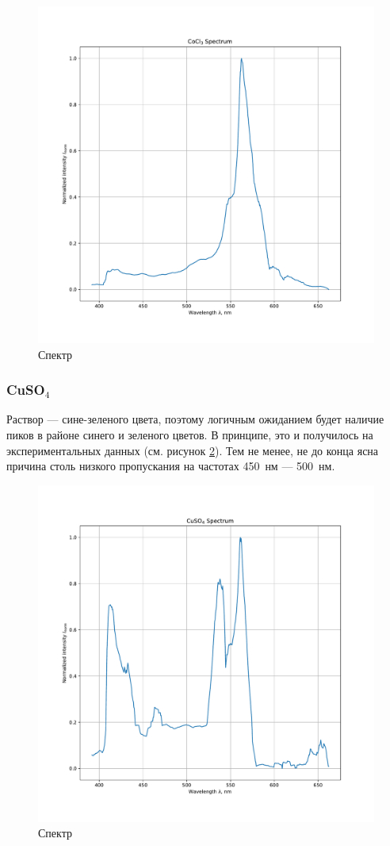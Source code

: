 \documentclass[a4paper, 12pt]{article}
\begin{document}
\begin{figure}[H]
	\centering
	\includegraphics[width=0.7\linewidth]{cocl3.pdf}
	\caption{Спектр }
	\label{fig:cocl3}
\end{figure}

\subsubsection{CuSO$_4$}

Раствор  --- сине-зеленого цвета, поэтому логичным ожиданием будет наличие пиков в районе синего и зеленого цветов. В принципе, это и получилось на экспериментальных данных (см. рисунок \ref{fig:cuso4}). Тем не менее, не до конца ясна причина столь низкого пропускания на частотах 450~нм --- 500~нм.

\begin{figure}[H]
	\centering
	\includegraphics[width=0.7\linewidth]{cuso4.pdf}
	\caption{Спектр }
	\label{fig:cuso4}
\end{figure}
\end{document}
